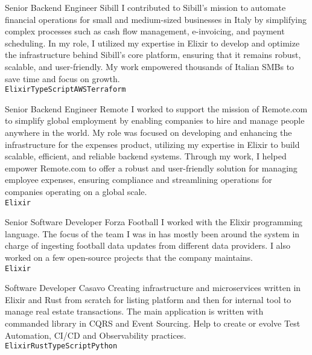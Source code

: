 \documentclass[9pt]{developercv}
\begin{document}
\begin{entrylist}
        {Senior Backend Engineer}
        {Sibill}
        {I contributed to Sibill's mission to automate financial operations for small and medium-sized businesses in Italy by simplifying complex processes such as cash flow management, e-invoicing, and payment scheduling. In my role, I utilized my expertise in Elixir to develop and optimize the infrastructure behind Sibill’s core platform, ensuring that it remains robust, scalable, and user-friendly. My work empowered thousands of Italian SMBs to save time and focus on growth.\\
       \texttt{Elixir}\slashsep\texttt{TypeScript}\slashsep\texttt{AWS}\slashsep\texttt{Terraform}}

        {Senior Backend Engineer}
        {Remote}
        {I worked to support the mission of Remote.com to simplify global employment by enabling companies to hire and manage people anywhere in the world. My role was focused on developing and enhancing the infrastructure for the expenses product, utilizing my expertise in Elixir to build scalable, efficient, and reliable backend systems. Through my work, I helped empower Remote.com to offer a robust and user-friendly solution for managing employee expenses, ensuring compliance and streamlining operations for companies operating on a global scale.\\
       \texttt{Elixir}}

        {Senior Software Developer}
        {Forza Football}
        {I worked with the Elixir programming language. The focus of the team I was in has mostly been around the system in charge of ingesting football data updates from different data providers. I also worked on a few open-source projects that the company maintains.\\
       \texttt{Elixir}}

        {Software Developer}
        {Casavo}
        {Creating infrastructure and microservices written in Elixir and Rust from scratch for listing platform and then for internal tool to manage real estate transactions. The main application is written with commanded library in CQRS and Event Sourcing. Help to create or evolve Test Automation, CI/CD and Observability practices.\\
       \texttt{Elixir}\slashsep\texttt{Rust}\slashsep\texttt{TypeScript}\slashsep\texttt{Python}}


\end{entrylist}
\end{document}
